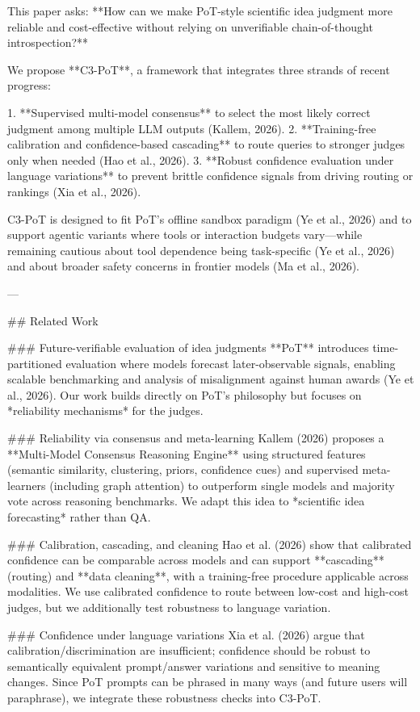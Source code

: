 This paper asks: **How can we make PoT-style scientific idea judgment more reliable and cost-effective without relying on unverifiable chain-of-thought introspection?**

We propose **C3-PoT**, a framework that integrates three strands of recent progress:

1. **Supervised multi-model consensus** to select the most likely correct judgment among multiple LLM outputs (Kallem, 2026).  
2. **Training-free calibration and confidence-based cascading** to route queries to stronger judges only when needed (Hao et al., 2026).  
3. **Robust confidence evaluation under language variations** to prevent brittle confidence signals from driving routing or rankings (Xia et al., 2026).

C3-PoT is designed to fit PoT’s offline sandbox paradigm (Ye et al., 2026) and to support agentic variants where tools or interaction budgets vary—while remaining cautious about tool dependence being task-specific (Ye et al., 2026) and about broader safety concerns in frontier models (Ma et al., 2026).

---

## Related Work  

### Future-verifiable evaluation of idea judgments  
**PoT** introduces time-partitioned evaluation where models forecast later-observable signals, enabling scalable benchmarking and analysis of misalignment against human awards (Ye et al., 2026). Our work builds directly on PoT’s philosophy but focuses on *reliability mechanisms* for the judges.

### Reliability via consensus and meta-learning  
Kallem (2026) proposes a **Multi-Model Consensus Reasoning Engine** using structured features (semantic similarity, clustering, priors, confidence cues) and supervised meta-learners (including graph attention) to outperform single models and majority vote across reasoning benchmarks. We adapt this idea to *scientific idea forecasting* rather than QA.

### Calibration, cascading, and cleaning  
Hao et al. (2026) show that calibrated confidence can be comparable across models and can support **cascading** (routing) and **data cleaning**, with a training-free procedure applicable across modalities. We use calibrated confidence to route between low-cost and high-cost judges, but we additionally test robustness to language variation.

### Confidence under language variations  
Xia et al. (2026) argue that calibration/discrimination are insufficient; confidence should be robust to semantically equivalent prompt/answer variations and sensitive to meaning changes. Since PoT prompts can be phrased in many ways (and future users will paraphrase), we integrate these robustness checks into C3-PoT.

